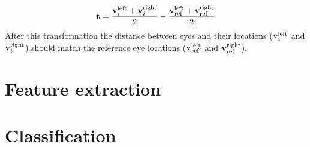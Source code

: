 \begin{equation}
    \label{eq:spec:preproc:midtr}
    \mathbf{t} = \frac{\mathbf{v}_i^{\text{left}} + \mathbf{v}_i^{\text{right}}}{2} - \frac{\mathbf{v}_{\text{ref}}^{\text{left}} + \mathbf{v}_{\text{ref}}^{\text{right}}}{2}
\end{equation}
After this transformation the distance between eyes and their locations
($\mathbf{v}_i^{\text{left}}$ and $\mathbf{v}_i^{\text{right}}$) should match the reference eye locations
($\mathbf{v}_{\text{ref}}^{\text{left}}$ and $\mathbf{v}_{\text{ref}}^{\text{right}}$).

\section{Feature extraction}


\section{Classification}

